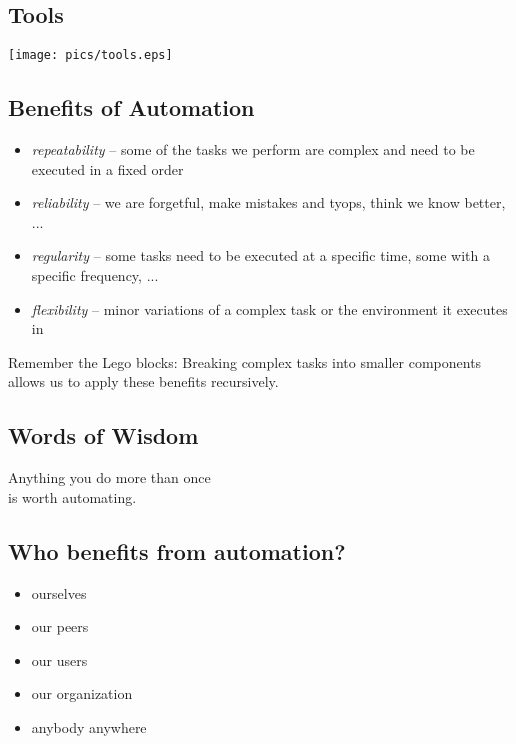 \documentclass[xga]{xdvislides}
\begin{document}
\subsection{Tools}
\vspace*{\fill}
\begin{center}
	\texttt{[image: pics/tools.eps]}
\end{center}
\vspace*{\fill}

\subsection{Benefits of Automation}
\begin{itemize}
	\item {\em repeatability} -- some of the tasks we
		perform are complex and need to be
		executed in a fixed order
	\item {\em reliability} -- we are forgetful, make
		mistakes and tyops, think we know
		better, ...
	\item {\em regularity} -- some tasks need to
		be executed at a specific time, some with
		a specific frequency, ...
	\item {\em flexibility} -- minor variations of
		a complex task or the environment it
		executes in
\end{itemize}

\vspace{.5in}
Remember the Lego blocks:  Breaking complex tasks
into smaller components allows us to apply these
benefits recursively.

\subsection{Words of Wisdom}
\vspace*{\fill}
\Huge
\begin{center}
Anything you do more than once \\
is worth automating.
\end{center}
\Normalsize
\vspace*{\fill}

\subsection{Who benefits from automation?}
\begin{itemize}
	\item ourselves
	\item our peers
	\item our users
	\item our organization
	\item anybody anywhere
\end{itemize}
\end{document}
